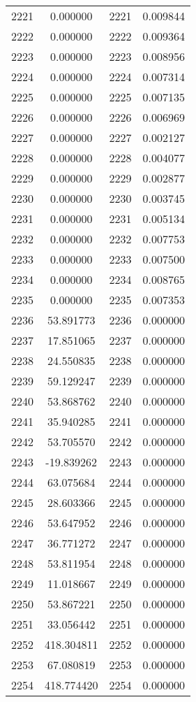 \documentclass[12pt]{article}
\begin{document}
\begin{longtable}{@{}cccc@{}}
2221 & 0.000000 & 2221 & 0.009844 \\
2222 & 0.000000 & 2222 & 0.009364 \\
2223 & 0.000000 & 2223 & 0.008956 \\
2224 & 0.000000 & 2224 & 0.007314 \\
2225 & 0.000000 & 2225 & 0.007135 \\
2226 & 0.000000 & 2226 & 0.006969 \\
2227 & 0.000000 & 2227 & 0.002127 \\
2228 & 0.000000 & 2228 & 0.004077 \\
2229 & 0.000000 & 2229 & 0.002877 \\
2230 & 0.000000 & 2230 & 0.003745 \\
2231 & 0.000000 & 2231 & 0.005134 \\
2232 & 0.000000 & 2232 & 0.007753 \\
2233 & 0.000000 & 2233 & 0.007500 \\
2234 & 0.000000 & 2234 & 0.008765 \\
2235 & 0.000000 & 2235 & 0.007353 \\
2236 & 53.891773 & 2236 & 0.000000 \\
2237 & 17.851065 & 2237 & 0.000000 \\
2238 & 24.550835 & 2238 & 0.000000 \\
2239 & 59.129247 & 2239 & 0.000000 \\
2240 & 53.868762 & 2240 & 0.000000 \\
2241 & 35.940285 & 2241 & 0.000000 \\
2242 & 53.705570 & 2242 & 0.000000 \\
2243 & -19.839262 & 2243 & 0.000000 \\
2244 & 63.075684 & 2244 & 0.000000 \\
2245 & 28.603366 & 2245 & 0.000000 \\
2246 & 53.647952 & 2246 & 0.000000 \\
2247 & 36.771272 & 2247 & 0.000000 \\
2248 & 53.811954 & 2248 & 0.000000 \\
2249 & 11.018667 & 2249 & 0.000000 \\
2250 & 53.867221 & 2250 & 0.000000 \\
2251 & 33.056442 & 2251 & 0.000000 \\
2252 & 418.304811 & 2252 & 0.000000 \\
2253 & 67.080819 & 2253 & 0.000000 \\
2254 & 418.774420 & 2254 & 0.000000 \\

\end{longtable}
\end{document}
